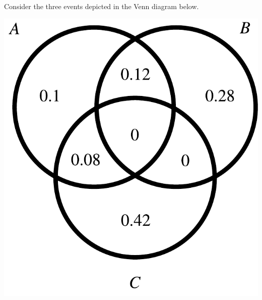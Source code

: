 \documentclass[12pt,letterpaper,addpoints]{exam}
\begin{document}
\begin{questions}
\newpage

\question[10] Consider the three events depicted in the Venn diagram below.
\begin{center}
\includegraphics[scale=0.6]{figures/venn.pdf}
\end{center}
\end{questions}
\end{document}
